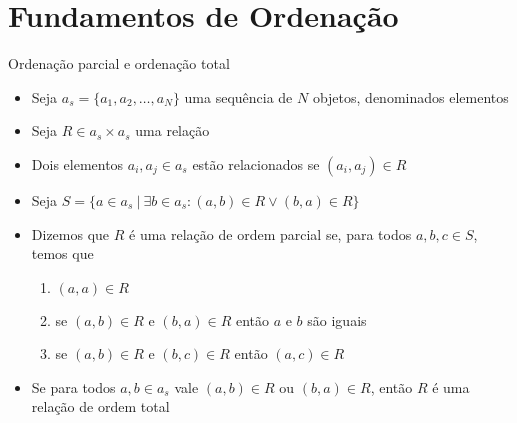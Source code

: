 \section{Fundamentos de Ordenação}

\begin{frame}[fragile]{Ordenação parcial e ordenação total}

    \begin{itemize}
        \item Seja $a_s = \lbrace a_1, a_2, \ldots, a_N\rbrace $ uma sequência de 
        $N$ objetos, denominados elementos

        \item Seja $R\in a_s\times a_s$ uma relação 

        \item Dois elementos $a_i, a_j\in a_s$ estão relacionados se 
            $(a_i, a_j)\in R$

        \item Seja $S = \lbrace a\in a_s\ | \ \exists b\in a_s : (a, b)\in R \vee (b, a)\in R
            \rbrace$

        \item Dizemos que $R$ é uma relação de ordem parcial se, para todos $a, b, c\in S$, 
            temos que
            \begin{enumerate}
                \item $(a, a)\in R$
                \item se $(a, b)\in R$ e $(b, a)\in R$ então $a$ e $b$ são iguais
                \item se $(a, b)\in R$ e $(b, c)\in R$ então $(a, c)\in R$
            \end{enumerate}

        \item Se para todos $a, b\in a_s$ vale $(a, b)\in R$ ou $(b, a)\in R$, então $R$ é uma
            relação de ordem total
    \end{itemize}

\end{frame}

